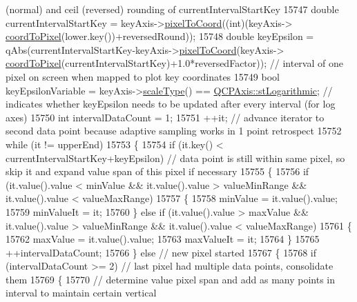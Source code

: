 \begin{DoxyCode}
{       (normal) and ceil (reversed) rounding of currentIntervalStartKey}
15747       \textcolor{keywordtype}{double} currentIntervalStartKey = keyAxis->\hyperlink{class_q_c_p_axis_ae9289ef7043b9d966af88eaa95b037d1}{pixelToCoord}((\textcolor{keywordtype}{int})(keyAxis->
      \hyperlink{class_q_c_p_axis_a985ae693b842fb0422b4390fe36d299a}{coordToPixel}(lower.key())+reversedRound));
15748       \textcolor{keywordtype}{double} keyEpsilon = qAbs(currentIntervalStartKey-keyAxis->\hyperlink{class_q_c_p_axis_ae9289ef7043b9d966af88eaa95b037d1}{pixelToCoord}(keyAxis->
      \hyperlink{class_q_c_p_axis_a985ae693b842fb0422b4390fe36d299a}{coordToPixel}(currentIntervalStartKey)+1.0*reversedFactor)); \textcolor{comment}{// interval of one pixel on screen
       when mapped to plot key coordinates}
15749       \textcolor{keywordtype}{bool} keyEpsilonVariable = keyAxis->\hyperlink{class_q_c_p_axis_a8563e13407bc0616da7f7c84e02de170}{scaleType}() == 
      \hyperlink{class_q_c_p_axis_a36d8e8658dbaa179bf2aeb973db2d6f0abf5b785ad976618816dc6f79b73216d4}{QCPAxis::stLogarithmic}; \textcolor{comment}{// indicates whether keyEpsilon needs to be updated after
       every interval (for log axes)}
15750       \textcolor{keywordtype}{int} intervalDataCount = 1;
15751       ++it; \textcolor{comment}{// advance iterator to second data point because adaptive sampling works in 1 point retrospect}
15752       \textcolor{keywordflow}{while} (it != upperEnd)
15753       \{
15754         \textcolor{keywordflow}{if} (it.key() < currentIntervalStartKey+keyEpsilon) \textcolor{comment}{// data point is still within same pixel, so
       skip it and expand value span of this pixel if necessary}
15755         \{
15756           \textcolor{keywordflow}{if} (it.value().value < minValue && it.value().value > valueMinRange && it.value().value < 
      valueMaxRange)
15757           \{
15758             minValue = it.value().value;
15759             minValueIt = it;
15760           \} \textcolor{keywordflow}{else} \textcolor{keywordflow}{if} (it.value().value > maxValue && it.value().value > valueMinRange && it.value().value < 
      valueMaxRange)
15761           \{
15762             maxValue = it.value().value;
15763             maxValueIt = it;
15764           \}
15765           ++intervalDataCount;
15766         \} \textcolor{keywordflow}{else} \textcolor{comment}{// new pixel started}
15767         \{
15768           \textcolor{keywordflow}{if} (intervalDataCount >= 2) \textcolor{comment}{// last pixel had multiple data points, consolidate them}
15769           \{
15770             \textcolor{comment}{// determine value pixel span and add as many points in interval to maintain certain vertical
}
\end{DoxyCode}
